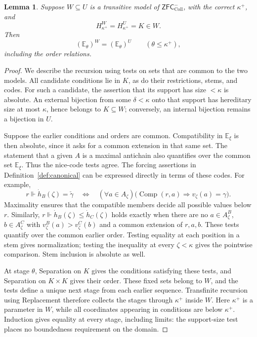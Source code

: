 \documentclass[11pt,a4paper]{amsart}
\newtheorem{lemma}[theorem]{Lemma}
\theoremstyle{definition}
\theoremstyle{remark}
\newcommand{\EE}{\mathbb E}
\newcommand{\ZFCc}{\mathsf{ZFC}^{-}_{\mathrm{Coll}}}
\DeclareMathOperator{\Comp}{Comp}
\begin{document}
\begin{lemma}
\label{lem:canonical-absolute}
Suppose \(W\subseteq U\) is a transitive model of
\(\ZFCc\), with the correct \(\kappa^+\), and
\[
 H_{\kappa^+}^W=H_{\kappa^+}^U=K\in W.
\]
Then
\[
 (\EE_\theta)^W=(\EE_\theta)^U
                 \qquad(\theta\leq\kappa^+),
\]
including the order relations.
\end{lemma}
\begin{proof}
We describe the recursion using tests on sets that are
common to the two models. All candidate conditions lie
in \(K\), as do their restrictions, stems, and codes.
For such a candidate, the assertion that its support has
size \(<\kappa\) is absolute. An external bijection
from some \(\delta<\kappa\) onto that support has
hereditary size at most \(\kappa\), hence belongs to
\(K\subseteq W\); conversely, an internal bijection
remains a bijection in \(U\).

Suppose the earlier conditions and orders are common.
Compatibility in \(\EE_\xi\) is then absolute, since
it asks for a common extension in that same set. The
statement that a given \(A\) is a maximal antichain
also quantifies over the common set \(\EE_\xi\).
Thus the nice-code tests agree. The forcing assertions
in Definition~\ref{def:canonical} can be expressed
directly in terms of these codes. For example,
\[
 r\Vdash\dot h_B(\zeta)=\check\gamma
 \quad\Longleftrightarrow\quad
 (\forall a\in A_\zeta)
   \bigl(\Comp(r,a)\Rightarrow v_\zeta(a)=\gamma\bigr).
\]
Maximality ensures that the compatible members decide
all possible values below \(r\). Similarly,
\(r\Vdash\dot h_B(\zeta)\leq\dot h_C(\zeta)\)
holds exactly when there are no
\(a\in A_\zeta^B\), \(b\in A_\zeta^C\) with
\(v_\zeta^B(a)>v_\zeta^C(b)\) and a common
extension of \(r,a,b\). These tests quantify over
the common earlier order. Testing equality at each
position in a stem gives normalization; testing the
inequality at every \(\zeta<\kappa\) gives the
pointwise comparison. Stem inclusion is absolute as well.

At stage \(\theta\), Separation on \(K\) gives
the conditions satisfying these tests, and Separation
on \(K\times K\) gives their order. These fixed sets
belong to \(W\), and the tests define a unique next stage
from each earlier sequence. Transfinite recursion using
Replacement therefore collects the stages through
\(\kappa^+\) inside \(W\). Here \(\kappa^+\)
is a parameter in \(W\), while all coordinates
appearing in conditions are below \(\kappa^+\).
Induction gives equality at every stage, including
limits: the support-size test places no boundedness
requirement on the domain.
\end{proof}
\end{document}
